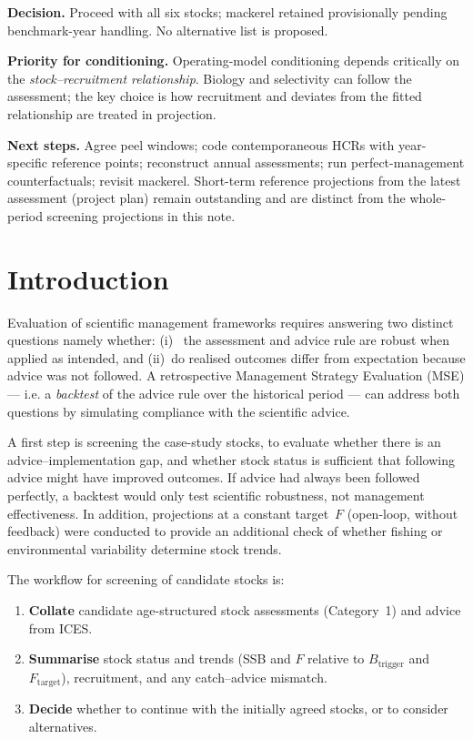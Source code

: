 \documentclass[11pt,a4paper]{extarticle}
\begin{document}
{\textbf{Decision.} Proceed with all six stocks; mackerel retained provisionally
pending benchmark-year handling. No alternative list is proposed.

\textbf{Priority for conditioning.} Operating-model conditioning depends
critically on the \emph{stock--recruitment relationship}. Biology and
selectivity can follow the assessment; the key choice is how recruitment and
deviates from the fitted relationship are treated in projection.

\textbf{Next steps.} Agree peel windows; code contemporaneous HCRs with
year-specific reference points; reconstruct annual assessments; run
perfect-management counterfactuals; revisit mackerel. Short-term reference
projections from the latest assessment (project plan) remain outstanding and
are distinct from the whole-period screening projections in this note.
\par
}%
\clearpage

\section{Introduction}

Evaluation of scientific management frameworks requires answering two distinct questions namely whether:
(i)~ the assessment and advice rule are robust when applied as intended, and (ii)~do realised outcomes differ from expectation because advice was not followed. A retrospective Management Strategy Evaluation (MSE) --- i.e. a \emph{backtest} of the advice rule over the historical period --- can address both questions by simulating compliance with the scientific advice.

A first step is screening the case-study stocks, to evaluate whether there is an advice--implementation gap, and whether stock status is sufficient that following advice might have improved outcomes. If advice had always
been followed perfectly, a backtest would only test scientific robustness, not management effectiveness. In addition, projections at a constant target~\(F\) (open-loop, without feedback) were conducted to provide an additional check of whether fishing or environmental variability determine stock trends.

The workflow for screening of candidate stocks is:

\begin{enumerate}
	\item \textbf{Collate} candidate age-structured stock assessments
	(Category~1) and advice from ICES.
	\item \textbf{Summarise} stock status and trends (SSB and \(F\) relative to
	\(B_{\mathrm{trigger}}\) and \(F_{\mathrm{target}}\)), recruitment, and any
	catch--advice mismatch.
	\item \textbf{Decide} whether to continue with the initially agreed stocks, or to consider alternatives.
\end{enumerate}
\end{document}
